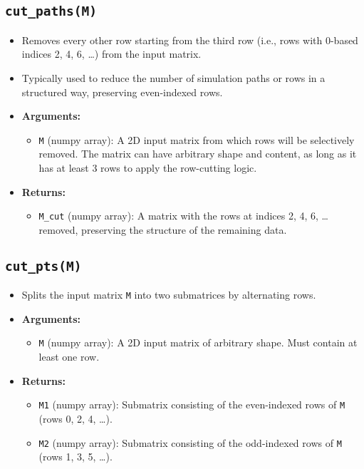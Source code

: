 \documentclass{article}
\begin{document}
\subsection{\texttt{cut\_paths(M)}}
\begin{itemize}
    \item Removes every other row starting from the third row (i.e., rows with 0-based indices 2, 4, 6, \dots) from the input matrix.
    \item Typically used to reduce the number of simulation paths or rows in a structured way, preserving even-indexed rows.
    \item \textbf{Arguments:}
    \begin{itemize}
        \item \texttt{M} (numpy array): A 2D input matrix from which rows will be selectively removed. The matrix can have arbitrary shape and content, as long as it has at least 3 rows to apply the row-cutting logic.
    \end{itemize}
    \item \textbf{Returns:}
    \begin{itemize}
        \item \texttt{M\_cut} (numpy array): A matrix with the rows at indices 2, 4, 6, \dots removed, preserving the structure of the remaining data.
    \end{itemize}
\end{itemize}

\subsection{\texttt{cut\_pts(M)}}
\begin{itemize}
    \item Splits the input matrix \texttt{M} into two submatrices by alternating rows.
    \item \textbf{Arguments:}
    \begin{itemize}
        \item \texttt{M} (numpy array): A 2D input matrix of arbitrary shape. Must contain at least one row.
    \end{itemize}
    \item \textbf{Returns:}
    \begin{itemize}
        \item \texttt{M1} (numpy array): Submatrix consisting of the even-indexed rows of \texttt{M} (rows 0, 2, 4, \dots).
        \item \texttt{M2} (numpy array): Submatrix consisting of the odd-indexed rows of \texttt{M} (rows 1, 3, 5, \dots).
    \end{itemize}
\end{itemize}
\end{document}
